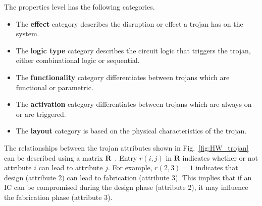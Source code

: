 \documentclass[conference]{IEEEtran}
\begin{document}
The properties level has the following categories.
\begin{itemize}
	\item The \textbf{effect} category describes the disruption or effect a trojan has on the system.
	\item The \textbf{logic type} category describes the circuit logic that triggers the trojan, either combinational logic or sequential.
	\item The \textbf{functionality} category differentiates between trojans which are functional or parametric.
	\item The \textbf{activation} category differentiates between trojans which are always on or are triggered.
	\item The \textbf{layout} category is based on the physical characteristics of the trojan.
\end{itemize}
The relationships between the trojan attributes shown in Fig.~\ref{fig:HW_trojan} can be described using a matrix $\mathbf{R}$~\cite{samerAttribute}.
Entry $r(i,j)$ in $\mathbf{R}$ indicates whether or not attribute $i$ can lead to attribute $j$.
For example, $r(2,3) = 1$ indicates that design (attribute 2) can lead to fabrication (attribute 3).
This implies that if an IC can be compromised during the design phase (attribute 2), it may influence the fabrication phase (attribute 3).
\end{document}
